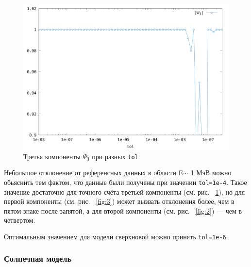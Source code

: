 \documentclass[12pt]{article}
\begin{document}
\begin{figure}[H]
  \hspace{0.5cm}
  \includegraphics[scale=0.5]{psi3_tol_sn}
  \caption{\label{fig:5}Третья компоненты \(\Psi_{3}\) при разных \texttt{tol}.}
\end{figure}

Небольшое отклонение от референсных данных в области E$\sim$ 1 МэВ можно обьяснить тем фактом, что данные были получены при значении \verb|tol=1e-4|. Такое значение достаточно для точного счёта третьей компоненты (см. рис. ~\ref{fig:5}), но для первой компоненты (см. рис. ~\ref{fig:3}) может вызвать отклонения более, чем в пятом знаке после запятой, а для второй компоненты (см. рис. ~\ref{fig:2}) — чем в четвертом.

Оптимальным значением для модели сверхновой можно принять \verb|tol=1e-6|.

\subsubsection*{Солнечная модель}
\end{document}
